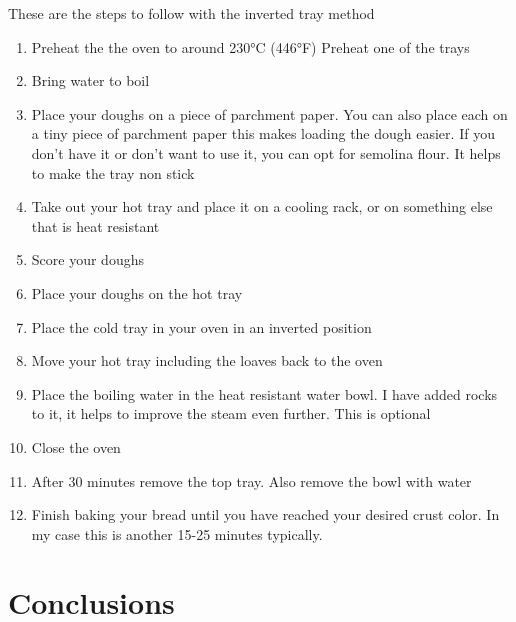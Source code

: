 These are the steps to follow with the inverted tray method
\begin{enumerate}
\item Preheat the the oven to around 230°C (446°F)
Preheat one of the trays
\item Bring water to boil
\item Place your doughs on a piece of parchment paper. You
can also place each on a tiny piece of parchment paper
this makes loading the dough easier. If you don't
have it or don't want to use it, you can opt for 
semolina flour. It helps to make the tray non stick
\item Take out your hot tray and place it
on a cooling rack, or on something else that
is heat resistant
\item Score your doughs
\item Place your doughs on the hot tray
\item Place the cold tray in your oven in an inverted position
\item Move your hot tray including the loaves back
to the oven
\item Place the boiling water in the heat resistant
water bowl. I have added rocks to it, it helps
to improve the steam even further. This is optional
\item Close the oven
\item After 30 minutes remove the top tray. Also remove the bowl with water
\item Finish baking your bread until you have reached your desired
crust color. In my case this is another 15-25 minutes typically.
\end{enumerate}

\section{Conclusions}


